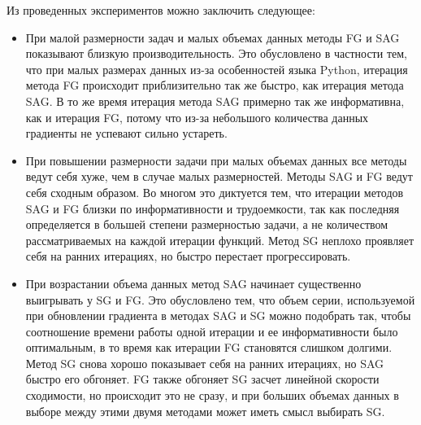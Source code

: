 \documentclass[12pt]{article}
\begin{document}
Из проведенных экспериментов можно заключить следующее:
\begin{itemize}
	\item При малой размерности задач и малых объемах данных методы FG и SAG показывают близкую производительность. Это обусловлено в частности тем, что  при малых размерах данных из-за особенностей языка Python, итерация метода FG происходит приблизительно так же быстро, как итерация метода SAG. В то же время итерация метода SAG примерно так же информативна, как и итерация FG, потому что из-за небольшого количества данных градиенты не успевают сильно устареть.
	
	\item При повышении размерности задачи при малых объемах данных все методы ведут себя хуже, чем в случае малых размерностей. Методы SAG и FG ведут себя сходным образом. Во многом это диктуется тем, что итерации методов SAG и FG близки по информативности и трудоемкости, так как последняя определяется в большей степени размерностью задачи, а не количеством рассматриваемых на каждой итерации функций. Метод SG неплохо проявляет себя на ранних итерациях, но быстро перестает прогрессировать.
	
	\item При возрастании объема данных метод SAG начинает существенно выигрывать у SG и FG. Это обусловлено тем, что объем серии, используемой при обновлении градиента в методах SAG и SG можно подобрать так, чтобы соотношение времени работы одной итерации и ее информативности было оптимальным, в то время как итерации FG становятся слишком долгими. Метод SG снова хорошо показывает себя на ранних итерациях, но SAG быстро его обгоняет. FG также обгоняет SG засчет линейной скорости сходимости, но происходит это не сразу, и при больших объемах данных в выборе между этими двумя методами может иметь смысл выбирать SG. 
	
	
\end{itemize}
\end{document}
